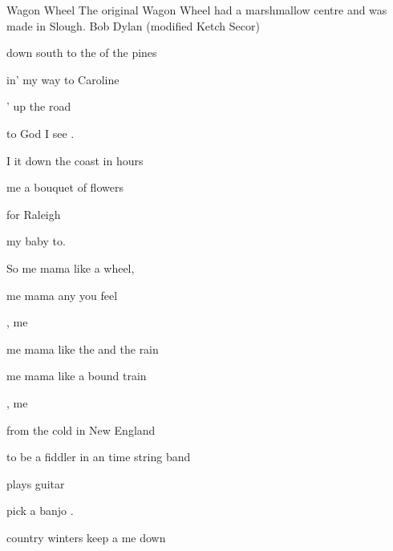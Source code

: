 \begin{SBSong}{Wagon Wheel}
  {The original Wagon Wheel had a marshmallow centre and was made in Slough.}
  {Bob Dylan (modified Ketch Secor)}
  \begin{SBVerse}
     down south to the  of the pines

    in' my way to  Caroline

    ' up the road

     to God I see .
  \end{SBVerse}
  \begin{SBVerse}
    I  it down the coast in   hours
    
     me a bouquet of  flowers
    
     for Raleigh
    
     my baby to.
  \end{SBVerse} 
  \begin{SBChorus}  
    So  me mama like a  wheel,
    
    me mama any you feel
    
    ,  me
    
    me mama like the  and the rain
    
    me mama like a bound train
    
    ,  me

  \end{SBChorus} 
  \begin{SBVerse}  
     from the cold  in New England
    
     to be a fiddler in an time string band
    
     plays guitar
    
     pick a banjo .
  \end{SBVerse} 
  \begin{SBVerse}  
     country winters keep a  me down
    

\end{SBVerse}
\end{SBSong}
